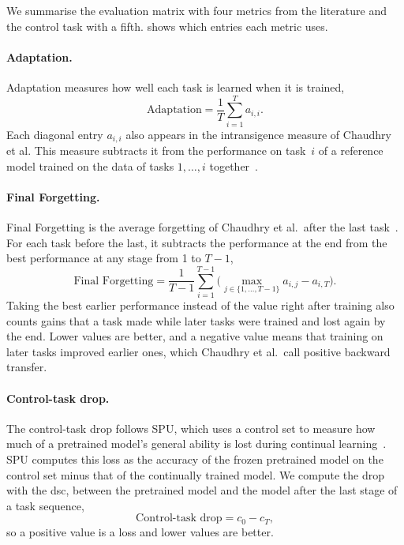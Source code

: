 We summarise the evaluation matrix with four metrics from the literature and the control task with a fifth.
 shows which entries each metric uses.

\paragraph{Adaptation.}
Adaptation measures how well each task is learned when it is trained,
\begin{equation}
\text{Adaptation} = \frac{1}{T} \sum_{i=1}^{T} a_{i,i}.
\label{eq:bg-adaptation}
\end{equation}
Each diagonal entry $a_{i,i}$ also appears in the intransigence measure of Chaudhry et al.
This measure subtracts it from the performance on task~$i$ of a reference model trained on the data of tasks $1, \dots, i$ together~\cite[Sec.~3, Eq.~4]{Chaudhry_2018}.

\paragraph{Final Forgetting.}
Final Forgetting is the average forgetting of Chaudhry et al.\ after the last task~\cite[Sec.~3, Eq.~3]{Chaudhry_2018}.
For each task before the last, it subtracts the performance at the end from the best performance at any stage from 1 to $T-1$,
\begin{equation}
\text{Final Forgetting} = \frac{1}{T-1} \sum_{i=1}^{T-1} \Big( \max_{j \in \{1, \dots, T-1\}} a_{i,j} - a_{i,T} \Big).
\label{eq:bg-forgetting}
\end{equation}
Taking the best earlier performance instead of the value right after training also counts gains that a task made while later tasks were trained and lost again by the end.
Lower values are better, and a negative value means that training on later tasks improved earlier ones, which Chaudhry et al.\ call positive backward transfer.

\paragraph{Control-task drop.}
The control-task drop follows SPU, which uses a control set to measure how much of a pretrained model's general ability is lost during continual learning~\cite[Sec.~5.1, Eq.~6]{Zhang_2024_CVPR}.
SPU computes this loss as the accuracy of the frozen pretrained model on the control set minus that of the continually trained model.
We compute the drop with the \gls{dsc}, between the pretrained model and the model after the last stage of a task sequence,
\begin{equation}
\text{Control-task drop} = c_0 - c_T,
\label{eq:bg-control-drop}
\end{equation}
so a positive value is a loss and lower values are better.


